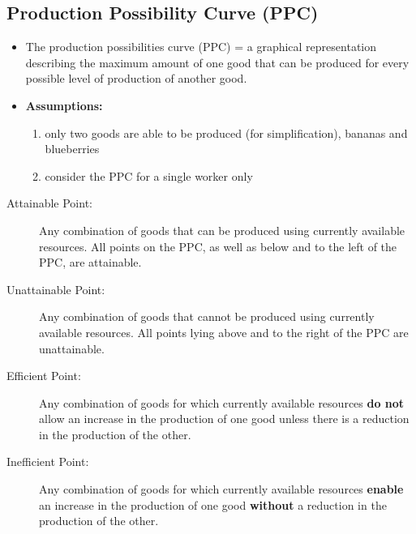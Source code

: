 \subsection{Production Possibility Curve (PPC)}
\begin{itemize}
	\item The production possibilities curve (PPC) = a graphical representation describing the maximum amount of one good that can be produced for every possible level of production of another good.
	\item\textbf{Assumptions:}
	\begin{enumerate}
		\item only two goods are able to be produced (for simplification), bananas and blueberries
		\item consider the PPC for a single worker only
	\end{enumerate}
\end{itemize}
\begin{description}
	\item[Attainable Point:] Any combination of goods that can be produced using currently available resources. All points on the PPC, as well as below and to the left of the PPC, are attainable.
	\item[Unattainable Point:] Any combination of goods that cannot be produced using currently available resources. All points lying above and to the right of the PPC are unattainable.
	\item[Efficient Point:] Any combination of goods for which currently available resources \textbf{do not} allow an increase in the production of one good unless there is a reduction in the production of the other.
	\item[Inefficient Point:] Any combination of goods for which currently available resources \textbf{enable} an increase in the production of one good \textbf{without} a reduction in the production of the other.
\end{description}